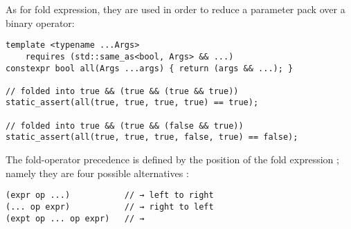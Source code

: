 As for fold expression, they are used in order to reduce a parameter pack over a binary operator:
\begin{verbatim}
template <typename ...Args>
    requires (std::same_as<bool, Args> && ...)
constexpr bool all(Args ...args) { return (args && ...); }

// folded into true && (true && (true && true))
static_assert(all(true, true, true, true) == true); 

// folded into true && (true && (false && true))
static_assert(all(true, true, true, false, true) == false); 
\end{verbatim}

The fold-operator precedence is defined by the position of the fold expression ; namely
they are four possible alternatives :
\begin{verbatim}
(expr op ...)           // → left to right
(... op expr)           // → right to left
(expt op ... op expr)   // → 
\end{verbatim}

